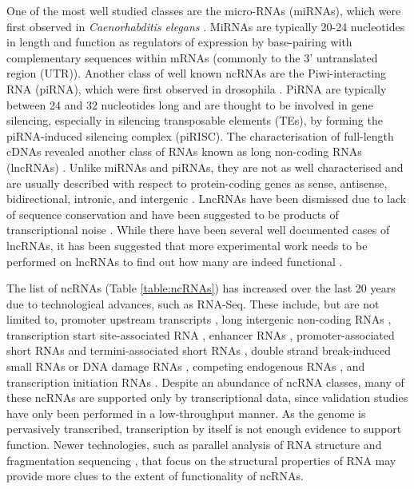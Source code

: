 One of the most well studied classes are the micro-RNAs (miRNAs), which were first observed in \textit{Caenorhabditis elegans} \citep{pmid8252621}. MiRNAs are typically 20-24 nucleotides in length and function as regulators of expression by base-pairing with complementary sequences within mRNAs (commonly to the 3' untranslated region (UTR)). Another class of well known ncRNAs are the Piwi-interacting RNA (piRNA), which were first observed in drosophila \citep{pmid11470406}. PiRNA are typically between 24 and 32 nucleotides long and are thought to be involved in gene silencing, especially in silencing transposable elements (TEs), by forming the piRNA-induced silencing complex (piRISC). The characterisation of full-length cDNAs revealed another class of RNAs known as long non-coding RNAs (lncRNAs) \citep{pmid12466851}. Unlike miRNAs and piRNAs, they are not as well characterised and are usually described with respect to protein-coding genes as sense, antisense, bidirectional, intronic, and intergenic \citep{pmid19239885}. LncRNAs have been dismissed due to lack of sequence conservation \citep{pmid15495343} and have been suggested to be products of transcriptional noise \citep{pmid15851066}. While there have been several well documented cases of lncRNAs, it has been suggested that more experimental work needs to be performed on lncRNAs to find out how many are indeed functional \citep{pmid23463798}.

The list of ncRNAs (Table \ref{table:ncRNAs}) has increased over the last 20 years due to technological advances, such as RNA-Seq. These include, but are not limited to, promoter upstream transcripts \citep{pmid19056938}, long intergenic non-coding RNAs \citep{pmid21890647, pmid22196729, pmid2943744}, transcription start site-associated RNA \citep{pmid21822281}, enhancer RNAs \citep{pmid20393465}, promoter-associated short RNAs and termini-associated short RNAs \citep{pmid17510325}, double strand break-induced small RNAs \citep{pmid22445173} or DNA damage RNAs \citep{francia2012site}, competing endogenous RNAs \citep{pmid24429633}, and transcription initiation RNAs \citep{pmid19377478}. Despite an abundance of ncRNA classes, many of these ncRNAs are supported only by transcriptional data, since validation studies have only been performed in a low-throughput manner. As the genome is pervasively transcribed, transcription by itself is not enough evidence to support function. Newer technologies, such as parallel analysis of RNA structure \citep{pmid20811459} and fragmentation sequencing \citep{pmid21057495}, that focus on the structural properties of RNA may provide more clues to the extent of functionality of ncRNAs.

